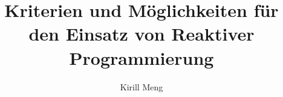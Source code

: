 \documentclass[oneside]{htwg-report} %
\begin{document}


\title[Kriterien und Möglichkeiten für den Einsatz von Reaktiver Programmierung]{Kriterien und Möglichkeiten für den Einsatz von Reaktiver Programmierung}

\author{Kirill Meng}


\makecover[]

\frontmatter
%          




%
%
\tableofcontents
%
%

%
%


%
%


%
%



\mainmatter


\setcounter{page}{1} 
%
%

%
%

%
%

%
%

%
%


\appendix


\printbibliography[heading=bibintoc]
\end{document}
